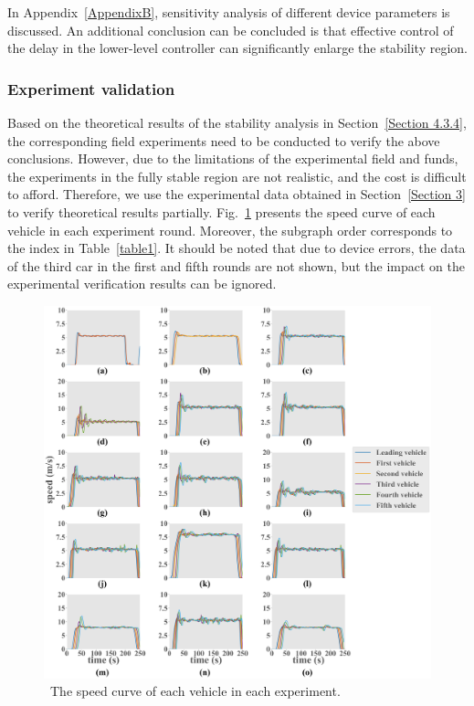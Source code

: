 \documentclass[journal]{IEEEtran}
\begin{document}
In Appendix~\ref{AppendixB}, sensitivity analysis of different device parameters is discussed. An additional conclusion can be concluded is that effective control of the delay in the lower-level controller can significantly enlarge the stability region.



\subsubsection{Experiment validation}
\label{Section 4.3.5}

Based on the theoretical results of the stability analysis in Section~\ref{Section 4.3.4}, the corresponding field experiments need to be conducted to verify the above conclusions. However, due to the limitations of the experimental field and funds, the experiments in the fully stable region are not realistic, and the cost is difficult to afford. Therefore, we use the experimental data obtained in Section~\ref{Section 3} to verify theoretical results partially. Fig.~\ref{fig7} presents the speed curve of each vehicle in each experiment round. Moreover, the subgraph order corresponds to the index in Table~\ref{table1}. It should be noted that due to device errors, the data of the third car in the first and fifth rounds are not shown, but the impact on the experimental verification results can be ignored.


\begin{figure}
  \centering
  \includegraphics[width=16cm]{figs/fig7.png}
  \caption{~The speed curve of each vehicle in each experiment.}
  \label{fig7}
\end{figure}
\end{document}
